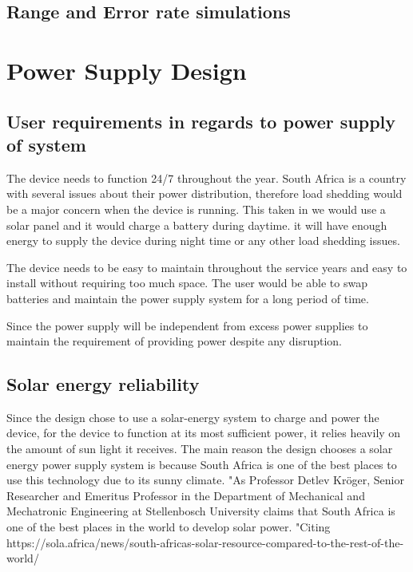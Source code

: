 \documentclass[12pt]{article}
\begin{document}
\subsection{Range and Error rate simulations}

\section{Power Supply Design}
\subsection{User requirements in regards to power supply of system}
The device needs to function 24/7 throughout the year. South Africa is a country with several issues about their power distribution, therefore load shedding would be a major concern when the device is running. This taken in we would use a solar panel and it would charge a battery during daytime. it will have enough energy to supply the device during night time or any other load shedding issues.

The device needs to be easy to maintain throughout the service years and easy to install without requiring too much space. The user would be able to swap batteries and maintain the power supply system for a long period of time.

Since the power supply will be independent from  excess power supplies to maintain the requirement of providing power despite any disruption.

\subsection{Solar energy reliability}
Since the design chose to use a solar-energy system to charge and power the device, for the device to function at its most sufficient power, it relies heavily on the amount of sun light it receives. The main reason the design chooses a solar energy power supply system is because South Africa is one of the best places to use this technology due to its sunny climate. "As Professor Detlev Kröger, Senior Researcher and Emeritus Professor in the Department of Mechanical and Mechatronic Engineering at Stellenbosch University claims that South Africa is one of the best places in the world to develop solar power. "Citing
https://sola.africa/news/south-africas-solar-resource-compared-to-the-rest-of-the-world/
\end{document}
